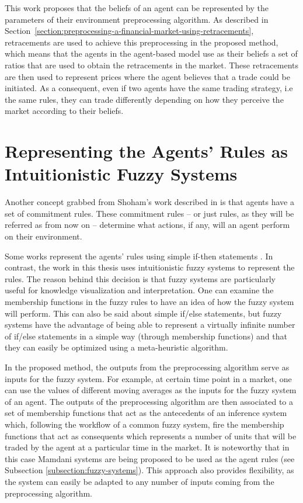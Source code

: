 This work proposes that the beliefs of an agent can be represented by the
parameters of their environment preprocessing algorithm. As described in 
Section~\ref{section:preprocessing-a-financial-market-using-retracements}, 
retracements
are used to achieve this preprocessing in the proposed method, which means that
the agents in the agent-based model use as their beliefs a set of ratios that
are used to obtain the retracements in the market. These retracements are then
used to represent prices where the agent believes that a trade could be
initiated. As a consequent, even if two agents have the same trading strategy,
i.e the same rules, they can trade differently depending on how they perceive
the market according to their beliefs.

\section{Representing the Agents' Rules as Intuitionistic Fuzzy Systems}
\label{section:representing-the-agents-rules-as-intuitionistic-fuzzy-systems}

Another concept grabbed from Shoham's work described in \cite{Shoham1993} is
that agents have a set of commitment rules. These commitment rules -- or just
rules, as they will be referred as from now on -- determine what actions, if
any, will an agent perform on their environment.

Some works represent the agents' rules using simple if-then statements
\cite{Niazi2011} \cite{Pellizzari2007}. In contrast, the work in this thesis
uses intuitionistic fuzzy systems to represent the rules. The reason behind this
decision is that fuzzy systems are particularly useful for knowledge
visualization and interpretation. One can examine the membership functions in
the fuzzy rules to have an idea of how the fuzzy system will perform. This can
also be said about simple if/else statements, but fuzzy systems have the
advantage of being able to represent a virtually infinite number of if/else
statements in a simple way (through membership functions) and that they can
easily be optimized using a meta-heuristic algorithm.

In the proposed method, the outputs from the preprocessing algorithm serve as
inputs for the fuzzy system. For example, at certain time point in a market, one
can use the values of different moving averages as the inputs for the fuzzy
system of an agent. The outputs of the preprocessing algorithm are then
associated to a set of membership functions that act as the antecedents of an
inference system which, following the workflow of a common fuzzy system, fire
the membership functions that act as consequents which represents a number of
units that will be traded by the agent at a particular time in the market. It is
noteworthy that in this case Mamdani systems are being proposed to be used as
the agent rules (see Subsection \ref{subsection:fuzzy-systems}). This approach
also provides flexibility, as the system can easily be adapted to any number of
inputs coming from the preprocessing algorithm.

